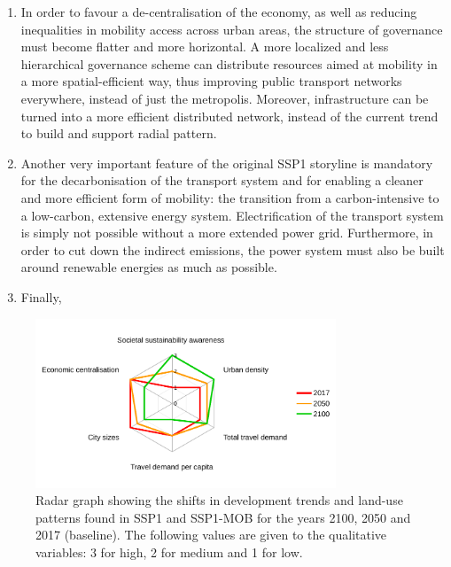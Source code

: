 \begin{enumerate}
\item In order to favour a de-centralisation of the economy, as well as reducing inequalities in mobility access across urban areas, the structure of governance must become flatter and more horizontal. A more localized and less hierarchical governance scheme can distribute resources aimed at mobility in a more spatial-efficient way, thus improving public transport networks everywhere, instead of just the metropolis. Moreover, infrastructure can be turned into a more efficient distributed network, instead of the current trend to build and support radial pattern.
\item Another very important feature of the original SSP1 storyline is mandatory for the decarbonisation of the transport system and for enabling a cleaner and more efficient form of mobility: the transition from a carbon-intensive to a low-carbon, extensive energy system. Electrification of the transport system is simply not possible without a more extended power grid. Furthermore, in order to cut down the indirect  emissions, the power system must also be built around renewable energies as much as possible.
\item Finally, 
\end{enumerate}

\begin{figure}
\centering
\includegraphics[width=0.8\textwidth]{figures/radar_development-scenario}
\caption[Shifts in development and land-use patterns in SSP1-MOB.]{Radar graph showing the shifts in development trends and land-use patterns found in SSP1 and SSP1-MOB for the years 2100, 2050 and 2017 (baseline). The following values are given to the qualitative variables: 3 for high, 2 for medium and 1 for low.}
\label{fig:results:radar_development-scenario}
\end{figure}

